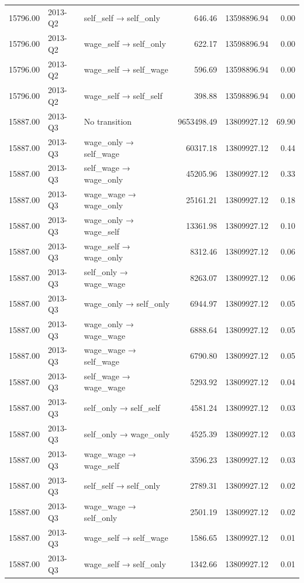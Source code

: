 \begin{table}[ht]
{\begin{tabular}{rllrrr}
  15796.00 & 2013-Q2 & self\_self → self\_only & 646.46 & 13598896.94 & 0.00 \\ 
  15796.00 & 2013-Q2 & wage\_self → self\_only & 622.17 & 13598896.94 & 0.00 \\ 
  15796.00 & 2013-Q2 & wage\_self → self\_wage & 596.69 & 13598896.94 & 0.00 \\ 
  15796.00 & 2013-Q2 & wage\_self → self\_self & 398.88 & 13598896.94 & 0.00 \\ 
  15887.00 & 2013-Q3 & No transition & 9653498.49 & 13809927.12 & 69.90 \\ 
  15887.00 & 2013-Q3 & wage\_only → self\_wage & 60317.18 & 13809927.12 & 0.44 \\ 
  15887.00 & 2013-Q3 & self\_wage → wage\_only & 45205.96 & 13809927.12 & 0.33 \\ 
  15887.00 & 2013-Q3 & wage\_wage → wage\_only & 25161.21 & 13809927.12 & 0.18 \\ 
  15887.00 & 2013-Q3 & wage\_only → wage\_self & 13361.98 & 13809927.12 & 0.10 \\ 
  15887.00 & 2013-Q3 & wage\_self → wage\_only & 8312.46 & 13809927.12 & 0.06 \\ 
  15887.00 & 2013-Q3 & self\_only → wage\_wage & 8263.07 & 13809927.12 & 0.06 \\ 
  15887.00 & 2013-Q3 & wage\_only → self\_only & 6944.97 & 13809927.12 & 0.05 \\ 
  15887.00 & 2013-Q3 & wage\_only → wage\_wage & 6888.64 & 13809927.12 & 0.05 \\ 
  15887.00 & 2013-Q3 & wage\_wage → self\_wage & 6790.80 & 13809927.12 & 0.05 \\ 
  15887.00 & 2013-Q3 & self\_wage → wage\_wage & 5293.92 & 13809927.12 & 0.04 \\ 
  15887.00 & 2013-Q3 & self\_only → self\_self & 4581.24 & 13809927.12 & 0.03 \\ 
  15887.00 & 2013-Q3 & self\_only → wage\_only & 4525.39 & 13809927.12 & 0.03 \\ 
  15887.00 & 2013-Q3 & wage\_wage → wage\_self & 3596.23 & 13809927.12 & 0.03 \\ 
  15887.00 & 2013-Q3 & self\_self → self\_only & 2789.31 & 13809927.12 & 0.02 \\ 
  15887.00 & 2013-Q3 & wage\_wage → self\_only & 2501.19 & 13809927.12 & 0.02 \\ 
  15887.00 & 2013-Q3 & wage\_self → self\_wage & 1586.65 & 13809927.12 & 0.01 \\ 
  15887.00 & 2013-Q3 & wage\_self → self\_only & 1342.66 & 13809927.12 & 0.01 \\ 

\end{tabular}}
\end{table}
